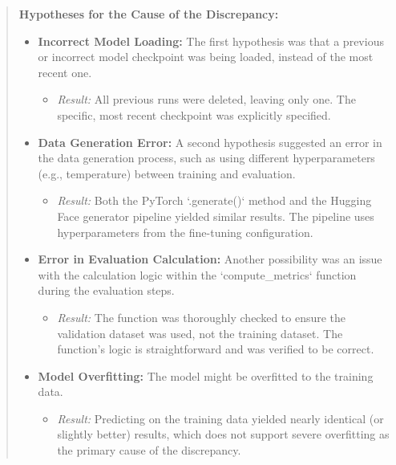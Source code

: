 \documentclass{article}
\begin{document}
\begin{quote}
\footnotesize{
\textbf{Hypotheses for the Cause of the Discrepancy:}
\begin{itemize}
    \item \textbf{Incorrect Model Loading:} The first hypothesis was that a previous or incorrect model checkpoint was being loaded, instead of the most recent one.
        \begin{itemize}
            \item \textit{Result:} All previous runs were deleted, leaving only one. The specific, most recent checkpoint was explicitly specified.
        \end{itemize}

    \item \textbf{Data Generation Error:} A second hypothesis suggested an error in the data generation process, such as using different hyperparameters (e.g., temperature) between training and evaluation.
        \begin{itemize}
            \item \textit{Result:} Both the PyTorch `.generate()` method and the Hugging Face generator pipeline yielded similar results. The pipeline uses hyperparameters from the fine-tuning configuration.
        \end{itemize}

    \item \textbf{Error in Evaluation Calculation:} Another possibility was an issue with the calculation logic within the `compute\_metrics` function during the evaluation steps.
        \begin{itemize}
            \item \textit{Result:} The function was thoroughly checked to ensure the validation dataset was used, not the training dataset. The function's logic is straightforward and was verified to be correct.
        \end{itemize}

    \item \textbf{Model Overfitting:} The model might be overfitted to the training data.
        \begin{itemize}
            \item \textit{Result:} Predicting on the training data yielded nearly identical (or slightly better) results, which does not support severe overfitting as the primary cause of the discrepancy.
        \end{itemize}
    

\end{itemize}}
\end{quote}
\end{document}
